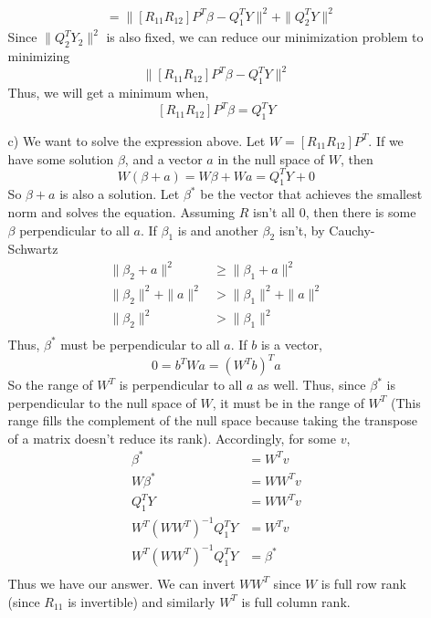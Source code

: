 \documentclass[11pt]{article}
\theoremstyle{definition}
\begin{document}
\begin{itemize}
\begin{itemize}
\begin{align*}
                    &= \| \left[R_{11} R_{12}\right] P^T \beta - Q_1^T Y \|^2 + \|Q_2^T Y\|^2
                \end{align*}
                Since $\|Q_2^TY_2\|^2$ is also fixed, we can reduce our minimization problem to minimizing 
                \[\| [R_{11} R_{12}] P^T \beta - Q_1^T Y \|^2\]
                Thus, we will get a minimum when,
                \[ \left[R_{11} R_{12}\right] P^T \beta = Q_1^T Y \]
            \item[c)]
                We want to solve the expression above. Let \(W=\left[R_{11} R_{12}\right] P^T\). If we have some solution $\beta$, and a vector $a$ in the null space of \(W\), then 
                \[ W(\beta+a) = W \beta + W a = Q_1^T Y + 0 \]
                So $\beta+a$ is also a solution. Let $\beta^*$ be the vector that achieves the smallest norm and solves the equation. Assuming $R$ isn't all $0$, then there is some $\beta$ perpendicular to all $a$. If $\beta_1$ is and another $\beta_2$ isn't, by Cauchy-Schwartz
                \begin{align*}
                    \|\beta_2+a\|^2 &\geq \|\beta_1 + a\|^2 \\
                    \|\beta_2\|^2 + \|a\|^2 &> \|\beta_1\|^2 + \|a\|^2 \\
                    \|\beta_2\|^2 &> \|\beta_1\|^2 \\
                \end{align*}
                Thus, $\beta^*$ must be perpendicular to all $a$. If $b$ is a vector, 
                \[0= b^T W a = (W^Tb)^T a \]
                So the range of \(W^T\) is perpendicular to all $a$ as well. Thus, since $\beta^*$ is perpendicular to the null space of \(W\), it must be in the range of \(W^T\) (This range fills the complement of the null space because taking the transpose of a matrix doesn't reduce its rank). Accordingly, for some $v$,
                \begin{align*}
                    \beta^* &= W^Tv \\
                    W\beta^* &= WW^Tv \\
                    Q_1^T Y &= WW^Tv  \\
                    W^T(WW^T)^{-1} Q_1^T Y &= W^T v \\
                    W^T(WW^T)^{-1} Q_1^T Y &= \beta^*  \\
                \end{align*}
                Thus we have our answer. We can invert \(WW^T\) since \(W\) is full row rank (since \(R_{11}\) is invertible) and similarly \(W^T\) is full column rank.

\end{itemize}
\end{itemize}
\end{document}
